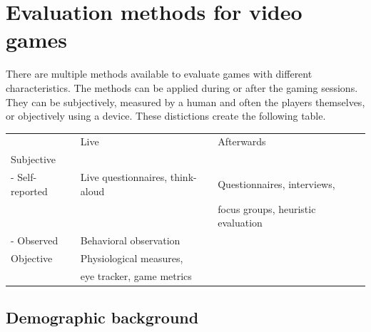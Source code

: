 \chapter{Evaluation methods for video games}
\label{ch:evaluationmethods}

There are multiple methods available to evaluate games with different characteristics. The methods can be applied during or after the gaming sessions. They can be subjectively, measured by a human and often the players themselves, or objectively using a device. These distictions create the following table.
 
\begin{table}[]
	\begin{tabular}{llll}
					& Live                                              & Afterwards\\
	Subjective      &                                                   & \\
	- Self-reported & Live questionnaires, think-aloud                  & Questionnaires, interviews,\\ 
					& 													& focus groups, heuristic evaluation \\
	- Observed      & Behavioral observation 							& \\
	Objective       & Physiological measures, 							& \\  
					& eye tracker, game metrics         				&\\                                                    
	\end{tabular}
\end{table}                                             								

\section{Demographic background}

